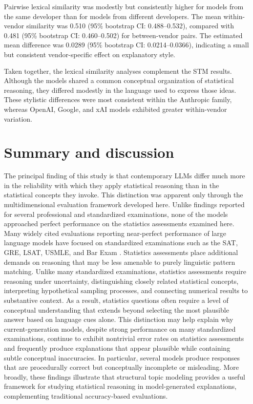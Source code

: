 \documentclass[APA,LATO2COL]{WileyNJDv5}
\begin{document}
Pairwise lexical similarity was modestly but consistently higher for models from the same developer than for models from different developers. The mean within-vendor similarity was 0.510 (95\% bootstrap CI: 0.488--0.532), compared with 0.481 (95\% bootstrap CI: 0.460--0.502) for between-vendor pairs. The estimated mean difference was 0.0289 (95\% bootstrap CI: 0.0214--0.0366), indicating a small but consistent vendor-specific effect on explanatory style.

Taken together, the lexical similarity analyses complement the STM results. Although the models shared a common conceptual organization of statistical reasoning, they differed modestly in the language used to express those ideas. These stylistic differences were most consistent within the Anthropic family, whereas OpenAI, Google, and xAI models exhibited greater within-vendor variation.


\section{Summary and discussion} \label{sec:summary}

The principal finding of this study is that contemporary LLMs differ much more in the reliability with which they apply statistical reasoning than in the statistical concepts they invoke. This distinction was apparent only through the multidimensional evaluation framework developed here. Unlike findings reported for several professional and standardized examinations, none of the models approached perfect performance on the statistics assessments examined here. Many widely cited evaluations reporting near-perfect performance of large language models have focused on standardized examinations such as the SAT, GRE, LSAT, USMLE, and Bar Exam \cite{taloni, cma, gupta, chat4bar}. Statistics assessments place additional demands on reasoning that may be less amenable to purely linguistic pattern matching. Unlike many standardized examinations, statistics assessments require reasoning under uncertainty, distinguishing closely related statistical concepts, interpreting hypothetical sampling processes, and connecting numerical results to substantive context. As a result, statistics questions often require a level of conceptual understanding that extends beyond selecting the most plausible answer based on language cues alone. This distinction may help explain why current-generation models, despite strong performance on many standardized examinations, continue to exhibit nontrivial error rates on statistics assessments and frequently produce explanations that appear plausible while containing subtle conceptual inaccuracies. In particular, several models produce responses that are procedurally correct but conceptually incomplete or misleading. More broadly, these findings illustrate that structural topic modeling provides a useful framework for studying statistical reasoning in model-generated explanations, complementing traditional accuracy-based evaluations.
\end{document}
